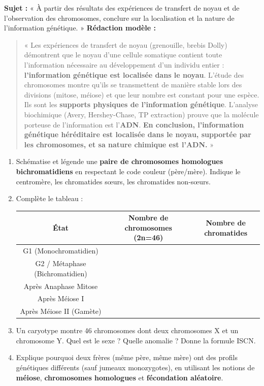 \documentclass[11pt]{article}
\begin{document}
\begin{exemplebox}
\textbf{Sujet :} « À partir des résultats des expériences de transfert de noyau et de l'observation des chromosomes, conclure sur la localisation et la nature de l'information génétique. »
\textbf{Rédaction modèle :}
\begin{quote}
« Les expériences de transfert de noyau (grenouille, brebis Dolly) démontrent que le noyau d'une cellule somatique contient toute l'information nécessaire au développement d'un individu entier : \textbf{l'information génétique est localisée dans le noyau}.
L'étude des chromosomes montre qu'ils se transmettent de manière stable lors des divisions (mitose, méiose) et que leur nombre est constant pour une espèce. Ils sont les \textbf{supports physiques de l'information génétique}.
L'analyse biochimique (Avery, Hershey-Chase, TP extraction) prouve que la molécule porteuse de l'information est l'\textbf{ADN}.
\textbf{En conclusion, l'information génétique héréditaire est localisée dans le noyau, supportée par les chromosomes, et sa nature chimique est l'ADN.} »
\end{quote}
\end{exemplebox}

\begin{exercice}
\begin{enumerate}
    \item Schématise et légende une \textbf{paire de chromosomes homologues bichromatidiens} en respectant le code couleur (père/mère). Indique le centromère, les chromatides sœurs, les chromatides non-sœurs.
    \item Complète le tableau :
    \begin{center}
    \begin{tabular}{|c|c|c|}\hline
    \textbf{État} & \textbf{Nombre de chromosomes (2n=46)} & \textbf{Nombre de chromatides} \\ \hline
    G1 (Monochromatidien) & & \\ \hline
    G2 / Métaphase (Bichromatidien) & & \\ \hline
    Après Anaphase Mitose & & \\ \hline
    Après Méiose I & & \\ \hline
    Après Méiose II (Gamète) & & \\ \hline
    \end{tabular}
    \end{center}
    \item Un caryotype montre 46 chromosomes dont deux chromosomes X et un chromosome Y. Quel est le sexe ? Quelle anomalie ? Donne la formule ISCN.
    \item Explique pourquoi deux frères (même père, même mère) ont des profils génétiques différents (sauf jumeaux monozygotes), en utilisant les notions de \textbf{méiose}, \textbf{chromosomes homologues} et \textbf{fécondation aléatoire}.
\end{enumerate}
\end{exercice}
\end{document}
